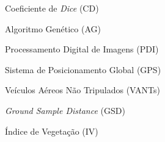 
Coeficiente de \textit{Dice} (CD)

Algoritmo Genético (AG)

Processamento Digital de Imagens (PDI)

Sistema de Posicionamento Global (GPS)

Veículos Aéreos Não Tripulados (VANTs)

\textit{Ground Sample Distance} (GSD)

Índice de Vegetação (IV)
